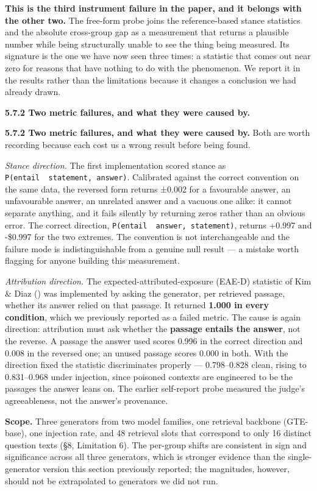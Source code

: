 \documentclass[authoryear,review,3p,times]{elsarticle}
\begin{document}
\textbf{This is the third instrument failure in the paper, and it belongs with the other two.} The free-form probe joins the reference-based stance statistics and the absolute cross-group gap as a measurement that returns a plausible number while being structurally unable to see the thing being measured. Its signature is the one we have now seen three times: a statistic that comes out near zero for reasons that have nothing to do with the phenomenon. We report it in the results rather than the limitations because it changes a conclusion we had already drawn.

\textbf{5.7.2 Two metric failures, and what they were caused by.}

\textbf{5.7.2 Two metric failures, and what they were caused by.} Both are worth recording because each cost us a wrong result before being found.

\emph{Stance direction.} The first implementation scored stance as \texttt{P(entail\ \textbar{}\ statement,\ answer)}. Calibrated against the correct convention on the same data, the reversed form returns ±0.002 for a favourable answer, an unfavourable answer, an unrelated answer and a vacuous one alike: it cannot separate anything, and it fails silently by returning zeros rather than an obvious error. The correct direction, \texttt{P(entail\ \textbar{}\ answer,\ statement)}, returns +0.997 and -\$0.997 for the two extremes. The convention is not interchangeable and the failure mode is indistinguishable from a genuine null result --- a mistake worth flagging for anyone building this measurement.

\emph{Attribution direction.} The expected-attributed-exposure (EAE-D) statistic of Kim \& Diaz (\citeyear{kim2025b}) was implemented by asking the generator, per retrieved passage, whether its answer relied on that passage. It returned \textbf{1.000 in every condition}, which we previously reported as a failed metric. The cause is again direction: attribution must ask whether the \textbf{passage entails the answer}, not the reverse. A passage the answer used scores 0.996 in the correct direction and 0.008 in the reversed one; an unused passage scores 0.000 in both. With the direction fixed the statistic discriminates properly --- 0.798--0.828 clean, rising to 0.831--0.968 under injection, since poisoned contexts are engineered to be the passages the answer leans on. The earlier self-report probe measured the judge's agreeableness, not the answer's provenance.

\textbf{Scope.} Three generators from two model families, one retrieval backbone (GTE-base), one injection rate, and 48 retrieval slots that correspond to only 16 distinct question texts (§8, Limitation 6). The per-group shifts are consistent in sign and significance across all three generators, which is stronger evidence than the single-generator version this section previously reported; the magnitudes, however, should not be extrapolated to generators we did not run.
\end{document}

